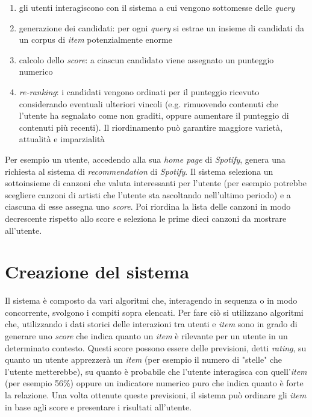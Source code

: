 \begin{enumerate}
    \item gli utenti interagiscono con il sistema a cui vengono sottomesse delle \textit{query}
    \item generazione dei candidati: per ogni \textit{query} si estrae un insieme di candidati da un corpus di \textit{item} potenzialmente enorme
    \item calcolo dello \textit{score}: a ciascun candidato viene assegnato un punteggio numerico
    \item \textit{re-ranking}: i candidati vengono ordinati per il punteggio ricevuto considerando eventuali ulteriori vincoli (e.g. rimuovendo contenuti che l'utente ha segnalato come non graditi, oppure aumentare il punteggio di contenuti più recenti). Il riordinamento può garantire maggiore varietà, attualità e imparzialità
\end{enumerate}

Per esempio un utente, accedendo alla sua \textit{home page} di \textit{Spotify}, genera una richiesta al sistema di \textit{recommendation} di \textit{Spotify}. Il sistema seleziona un sottoinsieme di canzoni che valuta interessanti per l'utente (per esempio potrebbe scegliere canzoni di artisti che l'utente sta ascoltando nell'ultimo periodo) e a ciascuna di esse assegna uno \textit{score}. Poi riordina la lista delle canzoni in modo decrescente rispetto allo score e seleziona le prime dieci canzoni da mostrare all'utente.

\section{Creazione del sistema}

Il sistema è composto da vari algoritmi che, interagendo in sequenza o in modo concorrente, svolgono i compiti sopra elencati. Per fare ciò si utilizzano algoritmi che, utilizzando i dati storici delle interazioni tra utenti e \textit{item} sono in grado di generare uno \textit{score} che indica quanto un \textit{item} è rilevante per un utente in un determinato contesto. Questi score possono essere delle previsioni, detti \textit{rating}, su quanto un utente apprezzerà un \textit{item} (per esempio il numero di "stelle" che l'utente metterebbe), su quanto è probabile che l'utente interagisca con quell'\textit{item} (per esempio 56\%) oppure un indicatore numerico puro che indica quanto è forte la relazione. Una volta ottenute queste previsioni, il sistema può ordinare gli \textit{item} in base agli score e presentare i risultati all'utente.

